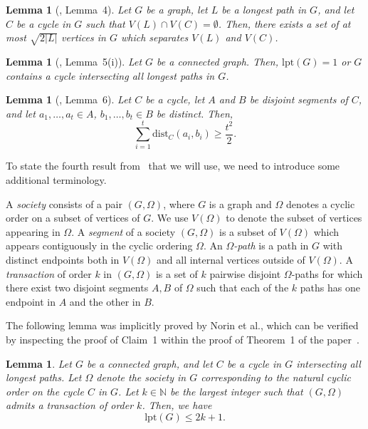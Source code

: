 \documentclass[11pt,reqno]{article}
\newtheorem{lemma}[theorem]{Lemma}
\begin{document}
\begin{lemma}[\cite{norin}, Lemma~4]\label{lem:a}
Let $G$ be a graph, let $L$ be a longest path in $G$, and let $C$ be a cycle in $G$ such that $V(L)\cap V(C)=\emptyset$. Then, there exists a set of at most $\sqrt{2|L|}$ vertices in $G$ which separates $V(L)$ and $V(C)$. 
\end{lemma}
\begin{lemma}[\cite{norin}, Lemma~5(i)]\label{lem:b}
Let $G$ be a connected graph. Then, $\mathrm{lpt}(G)=1$ or $G$ contains a cycle intersecting all longest paths in $G$.
\end{lemma}
\begin{lemma}[\cite{norin}, Lemma~6]\label{lem:disjointpairs}
Let $C$ be a cycle, let $A$ and $B$ be disjoint segments of $C$, and let $a_1,\ldots,a_t\in A$, $b_1,\ldots,b_t\in B$ be distinct. Then, $$\sum_{i=1}^{t}\mathrm{dist}_C(a_i,b_i)\ge \frac{t^2}{2}.$$   
\end{lemma}
To state the fourth result from~\cite{norin} that we will use, we need to introduce some additional terminology. 

A \emph{society} consists of a pair $(G,\Omega)$, where $G$ is a graph and $\Omega$ denotes a cyclic order on a subset of vertices of $G$. We use $V(\Omega)$ to denote the subset of vertices appearing in $\Omega$. A \emph{segment} of a society $(G,\Omega)$ is a subset of $V(\Omega)$ which appears contiguously in the cyclic ordering $\Omega$. An \emph{$\Omega$-path} is a path in $G$ with distinct endpoints both in $V(\Omega)$ and all internal vertices outside of $V(\Omega)$. A \emph{transaction} of order $k$ in $(G,\Omega)$ is a set of $k$ pairwise disjoint $\Omega$-paths for which there exist two disjoint segments $A, B$ of $\Omega$ such that each of the $k$ paths has one endpoint in $A$ and the other in $B$. 

The following lemma was implicitly proved by Norin et al., which can be verified by inspecting the proof of Claim~1 within the proof of Theorem~1 of the paper~\cite{norin}. 

\begin{lemma}\label{lem:c}
Let $G$ be a connected graph, and let $C$ be a cycle in $G$ intersecting all longest paths. Let $\Omega$ denote the society in $G$ corresponding to the natural cyclic order on the cycle $C$ in $G$. Let $k\in \mathbb{N}$ be the largest integer such that $(G,\Omega)$ admits a transaction of order $k$. Then, we have 
$$\mathrm{lpt}(G)\le 2k+1.$$
\end{lemma}
\end{document}
